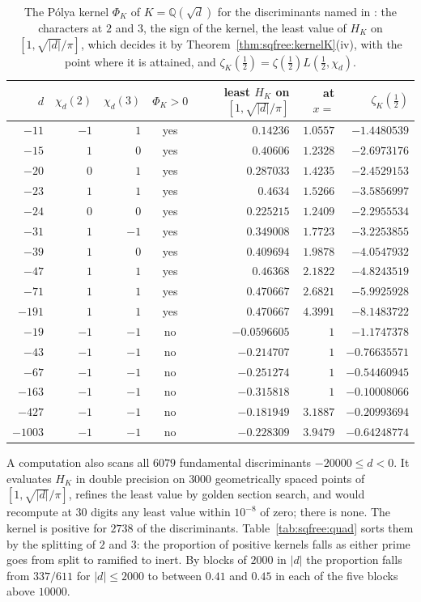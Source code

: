 \begin{table}[htbp]
\centering\small
\begin{tabular}{rrrcrrr}
\toprule
$d$ & $\chi_d(2)$ & $\chi_d(3)$ & $\Phi_K>0$ & least $H_K$ on $[1,\sqrt{|d|}/\pi]$ & at $x=$ & $\zeta_K(\frac12)$\\
\midrule
$-11$ & $-1$ & $1$ & yes & $0.14236$ & $1.0557$ & $-1.4480539$\\
$-15$ & $1$ & $0$ & yes & $0.40606$ & $1.2328$ & $-2.6973176$\\
$-20$ & $0$ & $1$ & yes & $0.287033$ & $1.4235$ & $-2.4529153$\\
$-23$ & $1$ & $1$ & yes & $0.4634$ & $1.5266$ & $-3.5856997$\\
$-24$ & $0$ & $0$ & yes & $0.225215$ & $1.2409$ & $-2.2955534$\\
$-31$ & $1$ & $-1$ & yes & $0.349008$ & $1.7723$ & $-3.2253855$\\
$-39$ & $1$ & $0$ & yes & $0.409694$ & $1.9878$ & $-4.0547932$\\
$-47$ & $1$ & $1$ & yes & $0.46368$ & $2.1822$ & $-4.8243519$\\
$-71$ & $1$ & $1$ & yes & $0.470667$ & $2.6821$ & $-5.9925928$\\
$-191$ & $1$ & $1$ & yes & $0.470667$ & $4.3991$ & $-8.1483722$\\
$-19$ & $-1$ & $-1$ & no & $-0.0596605$ & $1$ & $-1.1747378$\\
$-43$ & $-1$ & $-1$ & no & $-0.214707$ & $1$ & $-0.76635571$\\
$-67$ & $-1$ & $-1$ & no & $-0.251274$ & $1$ & $-0.54460945$\\
$-163$ & $-1$ & $-1$ & no & $-0.315818$ & $1$ & $-0.10008066$\\
$-427$ & $-1$ & $-1$ & no & $-0.181949$ & $3.1887$ & $-0.20993694$\\
$-1003$ & $-1$ & $-1$ & no & $-0.228309$ & $3.9479$ & $-0.64248774$\\
\bottomrule
\end{tabular}
\caption{The P\'olya kernel $\Phi_K$ of $K=\mathbb Q(\sqrt d)$ for the discriminants named in \cite{P26sqf}: the characters at $2$ and $3$, the sign of the kernel, the least value of $H_K$ on $[1,\sqrt{|d|}/\pi]$, which decides it by Theorem~\ref{thm:sqfree:kernelK}(iv), with the point where it is attained, and $\zeta_K(\frac12)=\zeta(\frac12)L(\frac12,\chi_d)$.}
\label{tab:sqfree:named}
\end{table}

A computation also scans all $6079$ fundamental discriminants $-20000\le d<0$. It evaluates $H_K$ in double precision on $3000$ geometrically spaced points of $[1,\sqrt{|d|}/\pi]$, refines the least value by golden section search, and would recompute at $30$ digits any least value within $10^{-8}$ of zero; there is none. The kernel is positive for $2738$ of the discriminants. Table~\ref{tab:sqfree:quad} sorts them by the splitting of $2$ and $3$: the proportion of positive kernels falls as either prime goes from split to ramified to inert. By blocks of $2000$ in $|d|$ the proportion falls from $337/611$ for $|d|\le2000$ to between $0.41$ and $0.45$ in each of the five blocks above $10000$.

